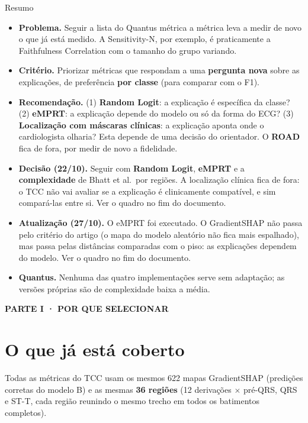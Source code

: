 \documentclass[11pt,a4paper]{article}
\newcommand{\partbar}[1]{\par\vspace{1.2em}\noindent\colorbox{black!80}{\parbox{\dimexpr\linewidth-2\fboxsep}{\color{white}\bfseries\sffamily\MakeUppercase{#1}}}\par\vspace{0.4em}}
\begin{document}
\begin{infobox}[note]{Resumo}
\begin{itemize}
\item \textbf{Problema.} Seguir a lista do Quantus métrica a métrica leva a medir de novo o que já está medido. A Sensitivity-N, por exemplo, é praticamente a Faithfulness Correlation com o tamanho do grupo variando.
\item \textbf{Critério.} Priorizar métricas que respondam a uma \textbf{pergunta nova} sobre as explicações, de preferência \textbf{por classe} (para comparar com o F1).
\item \textbf{Recomendação.} (1) \textbf{Random Logit}: a explicação é específica da classe? (2) \textbf{eMPRT}: a explicação depende do modelo ou só da forma do ECG? (3) \textbf{Localização com máscaras clínicas}: a explicação aponta onde o cardiologista olharia? Esta depende de uma decisão do orientador. O \textbf{ROAD} fica de fora, por medir de novo a fidelidade.
\item \textbf{Decisão (22/10).} Seguir com \textbf{Random Logit}, \textbf{eMPRT} e a \textbf{complexidade} de Bhatt et al.\ por regiões. A localização clínica fica de fora: o TCC não vai avaliar se a explicação é clinicamente compatível, e sim compará-las entre si. Ver o quadro no fim do documento.
\item \textbf{Atualização (27/10).} O eMPRT foi executado. O GradientSHAP não passa pelo critério do artigo (o mapa do modelo aleatório não fica mais espalhado), mas passa pelas distâncias comparadas com o piso: as explicações dependem do modelo. Ver o quadro no fim do documento.
\item \textbf{Quantus.} Nenhuma das quatro implementações serve sem adaptação; as versões próprias são de complexidade baixa a média.
\end{itemize}
\end{infobox}

\partbar{Parte I · Por que selecionar}

\section{O que já está coberto}
Todas as métricas do TCC usam os mesmos 622 mapas GradientSHAP (predições corretas do modelo B) e as mesmas \textbf{36 regiões} (12 derivações $\times$ pré-QRS, QRS e ST-T, cada região reunindo o mesmo trecho em todos os batimentos completos).
\end{document}
